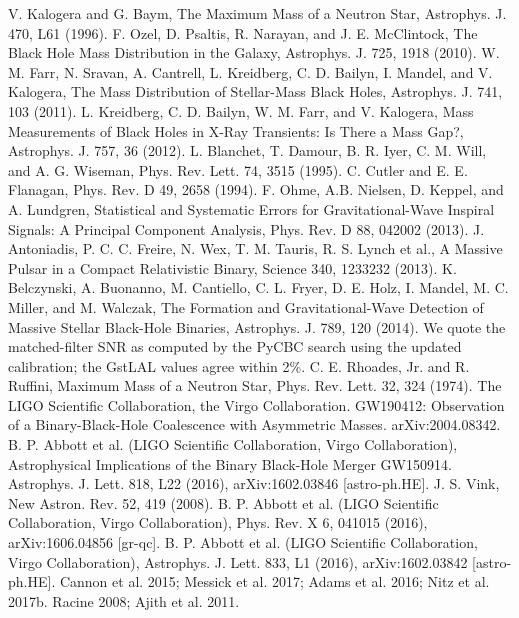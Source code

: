 \documentclass[binding=0.6cm, LaM]{sapthesis}
\begin{document}
\begin{thebibliography}{500}
	 V. Kalogera and G. Baym, The Maximum Mass of a Neutron Star, Astrophys. J. 470, L61 (1996). 
	 F. Ozel, D. Psaltis, R. Narayan, and J. E. McClintock, The Black Hole Mass Distribution in the Galaxy, Astrophys. J. 725, 1918 (2010). 
	 W. M. Farr, N. Sravan, A. Cantrell, L. Kreidberg, C. D. Bailyn, I. Mandel, and V. Kalogera, The Mass Distribution of Stellar-Mass Black Holes, Astrophys. J. 741, 103 (2011). 
	 L. Kreidberg, C. D. Bailyn, W. M. Farr, and V. Kalogera, Mass Measurements of Black Holes in X-Ray Transients: Is There a Mass Gap?, Astrophys. J. 757, 36 (2012). 
	 L. Blanchet, T. Damour, B. R. Iyer, C. M. Will, and A. G. Wiseman, Phys. Rev. Lett. 74, 3515 (1995).
	 C. Cutler and E. E. Flanagan, Phys. Rev. D 49, 2658 (1994). 
	 F. Ohme, A.B. Nielsen, D. Keppel, and A. Lundgren, Statistical and Systematic Errors for Gravitational-Wave Inspiral Signals: A Principal Component Analysis, Phys. Rev. D 88, 042002 (2013). 
	 J. Antoniadis, P. C. C. Freire, N. Wex, T. M. Tauris, R. S. Lynch et al., A Massive Pulsar in a Compact Relativistic Binary, Science 340, 1233232 (2013). 
	 K. Belczynski, A. Buonanno, M. Cantiello, C. L. Fryer, D. E. Holz, I. Mandel, M. C. Miller, and M. Walczak, The Formation and Gravitational-Wave Detection of Massive Stellar Black-Hole Binaries, Astrophys. J. 789, 120 (2014). 
	 We quote the matched-filter SNR as computed by the PyCBC search using the updated calibration; the GstLAL values agree within 2\%. 
	 C. E. Rhoades, Jr. and R. Ruffini, Maximum Mass of a Neutron Star, Phys. Rev. Lett. 32, 324 (1974).
         The LIGO Scientific Collaboration, the Virgo Collaboration. GW190412: Observation of a Binary-Black-Hole Coalescence with Asymmetric Masses. arXiv:2004.08342.
	 B. P. Abbott et al. (LIGO Scientific Collaboration, Virgo Collaboration), Astrophysical Implications of the Binary Black-Hole Merger GW150914. Astrophys. J. Lett. 818, L22 (2016), arXiv:1602.03846 [astro-ph.HE]. 
	 J. S. Vink, New Astron. Rev. 52, 419 (2008).
	 B. P. Abbott et al. (LIGO Scientific Collaboration, Virgo Collaboration), Phys. Rev. X 6, 041015 (2016), arXiv:1606.04856 [gr-qc]. 
	 B. P. Abbott et al. (LIGO Scientific Collaboration, Virgo Collaboration), Astrophys. J. Lett. 833, L1 (2016), arXiv:1602.03842 [astro-ph.HE]. 
	 Cannon et al. 2015; Messick et al. 2017; Adams et al. 2016; Nitz et al. 2017b.
	 Racine 2008; Ajith et al. 2011.

\end{thebibliography}
\end{document}
